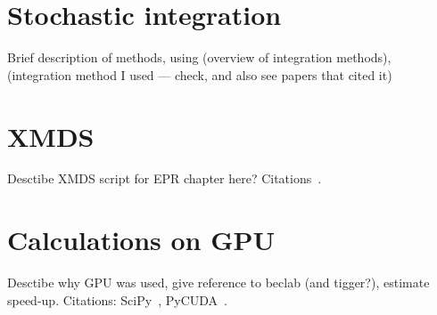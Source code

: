 \section{Stochastic integration}

Brief description of methods, using \cite{Werner1997} (overview of integration methods), \cite{Klauder1985} (integration method I used --- check, and also see papers that cited it)


\section{XMDS}

Desctibe XMDS script for EPR chapter here? Citations~\cite{Collecutt2001,Dennis2013}.

\section{Calculations on GPU}

Desctibe why GPU was used, give reference to beclab (and tigger?), estimate speed-up. Citations: SciPy~\cite{Oliphant2007}, PyCUDA~\cite{Klockner2012}.
